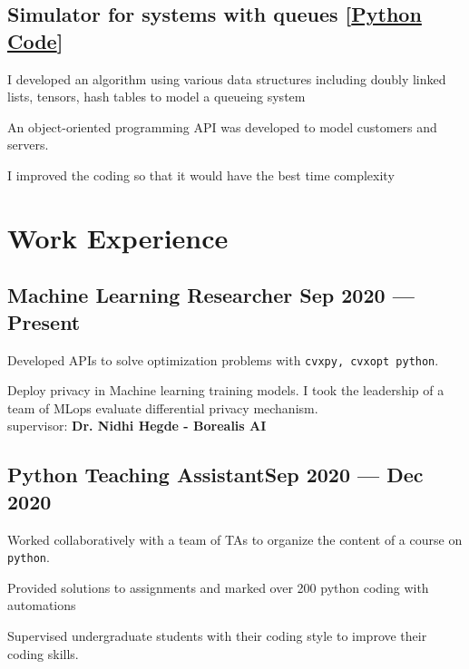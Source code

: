 \documentclass[letter,11pt]{article}
\begin{document}
\subsection{Simulator for systems with queues [\href{https://github.com/Hadi2525/queueing_theory}{Python Code}]}
\begin{zitemize}
	\item I developed an algorithm using various data structures including doubly linked lists, tensors, hash tables to model a queueing system
	\item An object-oriented programming API was developed to model customers and servers.
	\item I improved the coding so that it would have the best time complexity 
\end{zitemize}


\section{Work Experience}
\subsection{{Machine Learning Researcher \hfill Sep 2020 --- Present}}
\begin{zitemize}
	\item Developed APIs to solve optimization problems with \texttt{cvxpy, cvxopt python}.\\
	\item Deploy privacy in Machine learning training models. I took the leadership of a team of MLops evaluate differential privacy mechanism.\\
	supervisor: \textbf{Dr. Nidhi Hegde - Borealis AI}
	\end{zitemize}

\subsection{{Python Teaching Assistant\hfill Sep 2020 --- Dec 2020}}
\begin{zitemize}
	\item Worked collaboratively with a team of TAs to organize the content of a course on \texttt{python}.
	\item Provided solutions to assignments and marked over 200 python coding  with automations
	\item Supervised undergraduate students with their coding style to improve their coding skills.
\end{zitemize}
\end{document}
